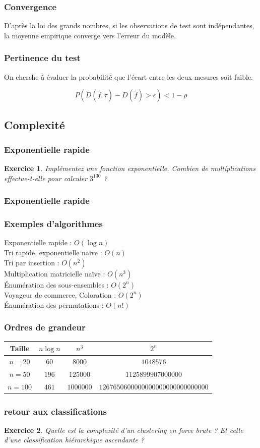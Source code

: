 \documentclass[11pt]{beamer}
\newenvironment{slide}[1]{%
\begin{frame}[environment=slide]
\frametitle{#1}
}{%
\end{frame}
}
\newtheorem{exercice}{Exercice}
\newcommand{\Python}[1]{
	{\small	}
}
\begin{document}
\begin{slide}{Convergence}

D'après la loi des grands nombres, si les observations de test sont indépendantes, la moyenne empirique converge vers l'erreur du modèle.
\end{slide}

\begin{slide}{Pertinence du test}
On cherche à évaluer la probabilité que l'écart entre les deux mesures soit faible.

$$P\left(\tilde{D}(\tilde{f},\tau)-D(\tilde{f}) > \epsilon \right) < 1 - \rho$$

\end{slide}

\subsection{Complexité}

\begin{slide}{Exponentielle rapide}
\begin{exercice}
Implémentez une fonction exponentielle. Combien de multiplications effectue-t-elle pour calculer $3^{130}$ ?
\end{exercice}
\end{slide}

\begin{slide}{Exponentielle rapide}
\Python{fastexp}
\end{slide}


\begin{slide}{Exemples d'algorithmes}

Exponentielle rapide : $O(\log n)$\\
Tri rapide, exponentielle naïve : $O(n)$\\
Tri par insertion : $O(n^2)$\\
Multiplication matricielle naïve : $O(n^3)$\\
{\'E}numération des sous-ensembles : $O(2^n)$\\
Voyageur de commerce, Coloration : $O(2^n)$\\
{\'E}numération des permutations : $O(n!)$

\end{slide}

\begin{slide}{Ordres de grandeur}
\begin{center}
\begin{tabular}{c|c|c|c}
Taille  & $n\log n$ & $n^3$ & $2^n$ \\
\hline
$n=20$ & $60$ & $8 000$ & $1 048 576$ \\
$n=50$ & $196$ & $125 000$ & $1 125 899 907 000 000$ \\
$n=100$ & $461$ & $1 000 000$ & $1 267 650 600 000 000 000 000 000 000 000$\\
\end{tabular}
\end{center}

\end{slide}

\begin{slide}{retour aux classifications}
\begin{exercice}
Quelle est la complexité d'un clustering en force brute ? Et celle d'une classification hiérarchique ascendante ?
\end{exercice}
\end{slide}
\end{document}

